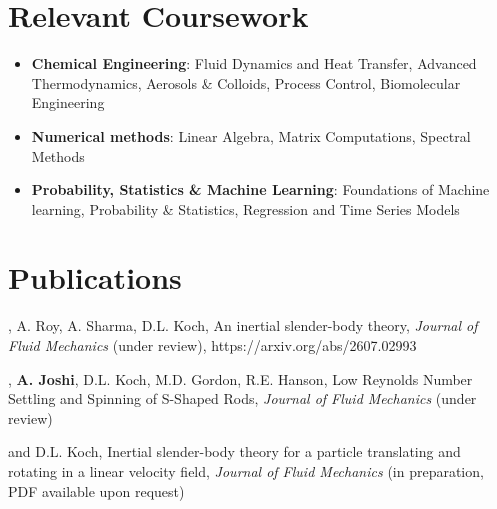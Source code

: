 \documentclass{resume}
\begin{document}
{\section{Relevant Coursework}
  \begin{itemize}[leftmargin=0.15in, label={$\vcenter{\hbox{\tiny$\bullet$}}$}, itemsep=0pt, parsep=1pt]
    \small
    \item \textbf{Chemical Engineering}: Fluid Dynamics and Heat Transfer, Advanced Thermodynamics, Aerosols \& Colloids, Process Control, Biomolecular Engineering 
    \item \textbf{Numerical methods}: Linear Algebra, Matrix Computations, Spectral Methods 
    \item \textbf{Probability, Statistics \& Machine Learning}: Foundations of Machine learning, Probability \& Statistics, Regression and Time Series Models 
  \end{itemize}



\section{Publications}
  \resumeSubHeadingListStart
      {, A. Roy, A. Sharma, D.L. Koch, An inertial slender-body theory,}
      {\textit{Journal of Fluid Mechanics}}
      { (under review),}
      {https://arxiv.org/abs/2607.02993}
  \resumeSubHeadingListEnd 

  \resumeSubHeadingListStart
      {, \textbf{A. Joshi}, D.L. Koch, M.D. Gordon, R.E. Hanson, Low Reynolds Number Settling and Spinning of S-Shaped Rods,}
      {\textit{Journal of Fluid Mechanics}}
      { (under review)}
      {}
  \resumeSubHeadingListEnd

  \resumeSubHeadingListStart
      { and D.L. Koch, Inertial slender-body theory for a particle translating and rotating in a linear velocity field,}
      {\textit{Journal of Fluid Mechanics}}
      { (in preparation, PDF available upon request)}
      {}
  \resumeSubHeadingListEnd  

}
\end{document}
